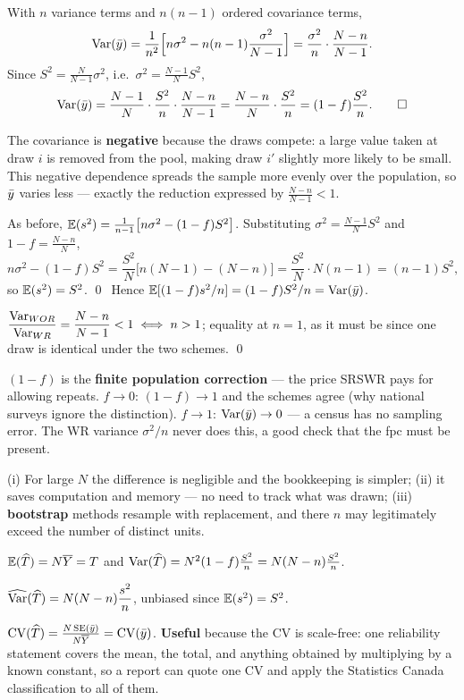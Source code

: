  With $n$ variance terms and $n(n-1)$ ordered covariance terms,
\[
  \operatorname{Var}(\bar{y})=\frac1{n^2}\Big[n\sigma^2-n(n-1)\frac{\sigma^2}{N-1}\Big]
  =\frac{\sigma^2}{n}\cdot\frac{N-n}{N-1}.
\]
Since $S^2=\frac{N}{N-1}\sigma^2$, i.e.\ $\sigma^2=\frac{N-1}{N}S^2$,
\[
  \operatorname{Var}(\bar{y})=\frac{N-1}{N}\cdot\frac{S^2}{n}\cdot\frac{N-n}{N-1}=\frac{N-n}{N}\cdot\frac{S^2}{n}
  =(1-f)\frac{S^2}{n}. \qquad\square
\]

 The covariance is \textbf{negative} because the draws compete: a large value taken at draw
$i$ is removed from the pool, making draw $i'$ slightly more likely to be small. This negative
dependence spreads the sample more evenly over the population, so $\bar{y}$ varies less --- exactly
the reduction expressed by $\frac{N-n}{N-1}<1$.

\sol As before,
$\mathbb{E}(s^2)=\frac{1}{n-1}\big[n\sigma^2-(1-f)S^2\big]$. Substituting
$\sigma^2=\frac{N-1}{N}S^2$ and $1-f=\frac{N-n}{N}$,
\[
  n\sigma^2-(1-f)S^2=\frac{S^2}{N}\big[n(N-1)-(N-n)\big]=\frac{S^2}{N}\cdot N(n-1)=(n-1)S^2,
\]
so $\mathbb{E}(s^2)=S^2$. \qed\ Hence $\mathbb{E}[(1-f)s^2/n]=(1-f)S^2/n=\operatorname{Var}(\bar{y})$.

 $\dfrac{\operatorname{Var}_{WOR}}{\operatorname{Var}_{WR}}=\dfrac{N-n}{N-1}<1\iff n>1$; equality at $n=1$, as it must
be since one draw is identical under the two schemes. \qed

 $(1-f)$ is the \textbf{finite population correction} --- the price SRSWR pays for allowing
repeats.
$f\to0$: $(1-f)\to1$ and the schemes agree (why national surveys ignore the distinction).
$f\to1$: $\operatorname{Var}(\bar{y})\to0$ --- a census has no sampling error. The WR variance $\sigma^2/n$ never
does this, a good check that the fpc must be present.

 (i) For large $N$ the difference is negligible and the bookkeeping is simpler;
(ii) it saves computation and memory --- no need to track what was drawn;
(iii) \textbf{bootstrap} methods resample with replacement, and there $n$ may legitimately exceed
the number of distinct units.

 $\mathbb{E}(\widehat{T})=N\overline{Y}=T$ and
$\operatorname{Var}(\widehat{T})=N^2(1-f)\frac{S^2}{n}=N(N-n)\frac{S^2}{n}$.

 $\widehat{\operatorname{Var}}(\widehat{T})=N(N-n)\dfrac{s^2}{n}$, unbiased since $\mathbb{E}(s^2)=S^2$.

 $\operatorname{CV}(\widehat{T})=\frac{N\operatorname{SE}(\bar{y})}{N\overline{Y}}=\operatorname{CV}(\bar{y})$. \textbf{Useful} because the CV is
scale-free: one reliability statement covers the mean, the total, and anything obtained by
multiplying by a known constant, so a report can quote one CV and apply the Statistics Canada
classification to all of them.

